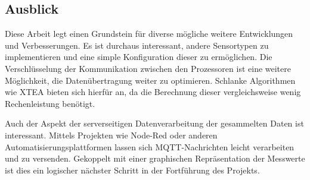 \subsection{Ausblick}
Diese Arbeit legt einen Grundstein für diverse mögliche weitere Entwicklungen und Verbesserungen. Es ist durchaus interessant, andere Sensortypen zu implementieren 
und eine simple Konfiguration dieser zu ermöglichen. Die Verschlüsselung der Kommunikation zwischen den Prozessoren ist eine weitere Möglichkeit, die Datenübertragung
weiter zu optimieren. Schlanke Algorithmen wie XTEA bieten sich hierfür an, da die Berechnung dieser vergleichsweise wenig Rechenleistung benötigt.

\smallskip

Auch der Aspekt der serverseitigen Datenverarbeitung der gesammelten Daten ist interessant. Mittels Projekten wie Node-Red oder anderen Automatisierungsplattformen 
lassen sich \ac{MQTT}-Nachrichten leicht verarbeiten und zu versenden. Gekoppelt mit einer graphischen Repräsentation der Messwerte ist dies ein logischer 
nächster Schritt in der Fortführung des Projekts.